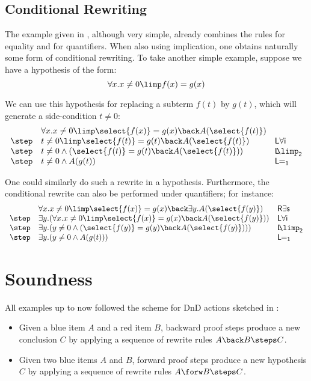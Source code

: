 \subsection{Conditional Rewriting}
The example given in , although very simple,
already combines the rules for equality and for quantifiers. When also
using implication, one obtains naturally some form of conditional
rewriting. To take another simple example, suppose we have a
hypothesis of the form:
$$\forall x. x\neq 0 \limp f(x) = g(x)$$

We can use this hypothesis for replacing a subterm $f(t)$ by $g(t)$,
which will generate a side-condition $t\neq 0$:
$$
\begin{array}{lll}
  &\forall x. x\neq 0 \limp \select{f(x)} = g(x) \back A(\select{f(t)}) &\\
  \step & t\neq 0 \limp \select{f(t)} = g(t) \back A(\select{f(t)}) &\mathsf{L \forall i}\\
  \step & t\neq 0 \land (\select{f(t)} = g(t) \back A(\select{f(t)})) & \mathsf{L\!\!\limp_2}\\
  \step &  t\neq 0 \land A(g(t)) &\mathsf{L\!\!=_1} \\
\end{array}$$

One could similarly do such a rewrite in a hypothesis. Furthermore,
the conditional rewrite can also be performed under quantifiers; for instance:
$$
\begin{array}{lll}
  &\forall x. x\neq 0 \limp \select{f(x)} = g(x) \back \exists y . A(\select{f(y)})
  &\mathsf{R \exists s}\\
  \step &\exists y. ( \forall x. x\neq 0 \limp \select{f(x)} = g(x) \back A(\select{f(y)})) &\mathsf{L \forall i}\\
  \step & \exists y. ( y\neq 0 \land ( \select{f(y)} = g(y) \back A(\select{f(y)}) )) &\mathsf{L\!\!\limp_2} \\
  \step & \exists y .( y\neq 0 \land A(g(t))) &\mathsf{L\!\!=_1} \\
\end{array}$$


\section{Soundness}

All examples up to now followed the scheme for DnD actions sketched in
:
\begin{itemize}
  \item Given a blue item $A$ and a red item $B$, backward proof steps produce a
  new conclusion $C$ by applying a sequence of rewrite rules $A \back B \steps
  C$.
  \item Given two blue items $A$ and $B$, forward proof steps produce a new
  hypothesis $C$ by applying a sequence of rewrite rules $A \forw B \steps C$.
\end{itemize}

